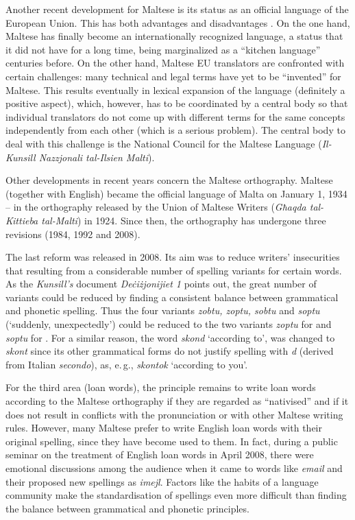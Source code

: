 \documentclass[]{../../metanetpaper}
\begin{document}
\begin{multicols}{2}
Another recent development for Maltese is its status as an official language of the European Union. This has both advantages and disadvantages \cite{Fabri:2011a}. On the one hand, Maltese has finally become an internationally recognized language, a status that it did not have for a long time, being marginalized as a ``kitchen language'' centuries before. On the other hand, Maltese EU translators are confronted with certain challenges: many technical and legal terms have yet to be ``invented'' for Maltese. This results eventually in lexical expansion of the language (definitely a positive aspect), which, however, has to be coordinated by a central body so that individual translators do not come up with different terms for the same concepts independently from each other (which is a serious problem). The central body to deal with this challenge is the National Council for the Maltese Language (\emph{Il-Kunsill Nazzjonali tal-Ilsien Malti}).

Other developments in recent years concern the Maltese orthography. Maltese (together with English) became the official language of Malta on January 1, 1934 – in the orthography released by the Union of Maltese Writers (\emph{Għaqda tal-Kittieba tal-Malti}) in 1924. Since then, the orthography has undergone three revisions (1984, 1992 and 2008).

The last reform was released in 2008. Its aim was to reduce writers' insecurities that resulting from a considerable number of spelling variants for certain words. As the \emph{Kunsill’s} document \emph{Deċiżjonijiet 1} \cite{Kunsill:2008a} points out, the great number of variants could be reduced by finding a consistent balance between grammatical and phonetic spelling. Thus the four variants \emph{zobtu, zoptu, sobtu} and \emph{soptu} (`suddenly, unexpectedly') could be reduced to the two variants \emph{zoptu} for  and \emph{soptu} for . For a similar reason, the word \emph{skond}  `according to', was changed to \emph{skont} since its other grammatical forms do not justify spelling with \emph{d} (derived from Italian \emph{secondo}), as, e.\,g., \emph{skontok}  `according to you'.

For the third area (loan words), the principle remains to write loan words according to the Maltese orthography if they are regarded as ``nativised'' and if it does not result in conflicts with the pronunciation or with other Maltese writing rules. However, many Maltese prefer to write English loan words with their original spelling, since they have become used to them. In fact, during a public seminar on the treatment of English loan words in April 2008, there were emotional discussions among the audience when it came to words like \emph{email} and their proposed new spellings as \emph{imejl}. Factors like the habits of a language community make the standardisation of spellings even more difficult than finding the balance between grammatical and phonetic principles. 


\end{multicols}
\end{document}
